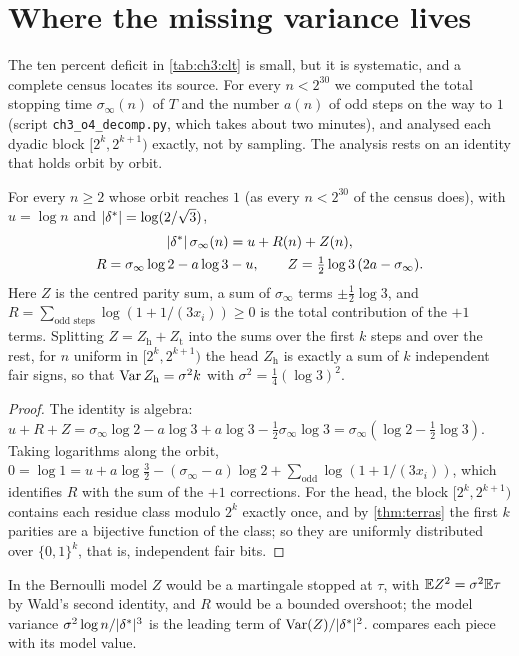 \section{Where the missing variance lives}\label{sec:ch3:missing}

The ten percent deficit in \cref{tab:ch3:clt} is small, but it is systematic,
and a complete census
locates its source. For every $n<2^{30}$ we computed the total stopping time
$\sigma_\infty(n)$ of $T$ and the number $a(n)$ of odd steps on the way to $1$ (script
\texttt{ch3\_o4\_decomp.py}, which takes about two minutes), and analysed each
dyadic block $[2^k,2^{k+1})$ exactly, not by sampling. The analysis rests on an
identity that holds orbit by orbit.

\begin{proposition}\label{prop:ch3:pathwise}
For every $n\ge2$ whose orbit reaches $1$ (as every $n<2^{30}$ of the census does), with $u=\log n$ and $|\delta^{*}|=\log(2/\sqrt3)$,
\begin{gather*}
  |\delta^{*}|\,\sigma_\infty(n)=u+R(n)+Z(n),\\
  R=\sigma_\infty\log2-a\log3-u,\qquad Z=\tfrac12\log3\,(2a-\sigma_\infty).
\end{gather*}
Here $Z$ is the centred parity sum, a sum of $\sigma_\infty$ terms $\pm\frac12\log3$, and
$R=\sum_{\text{odd steps}}\log(1+1/(3x_i))\ge0$ is the total contribution of the
$+1$ terms. Splitting $Z=Z_{\mathrm h}+Z_{\mathrm t}$ into the sums over the first
$k$ steps and over the rest, for $n$ uniform in $[2^k,2^{k+1})$ the head
$Z_{\mathrm h}$ is exactly a sum of $k$ independent fair signs, so that
$\operatorname{Var} Z_{\mathrm h}=\sigma^2k$ with $\sigma^2=\frac14(\log3)^2$.
\end{proposition}

\begin{proof}
The identity is algebra: $u+R+Z=\sigma_\infty\log2-a\log3+a\log3-\frac12\sigma_\infty\log3=
\sigma_\infty(\log2-\frac12\log3)$. Taking logarithms along the orbit,
$0=\log1=u+a\log\frac32-(\sigma_\infty-a)\log2+\sum_{\text{odd}}\log(1+1/(3x_i))$, which
identifies $R$ with the sum of the $+1$ corrections. For the head, the block
$[2^k,2^{k+1})$ contains each residue class modulo $2^k$ exactly once, and by
\cref{thm:terras} the first $k$ parities are a bijective function of the class;
so they are uniformly distributed over $\{0,1\}^k$, that is, independent fair
bits.
\end{proof}

In the Bernoulli model $Z$ would be a martingale stopped at $\tau$, with
$\mathbb{E} Z^2=\sigma^2\mathbb{E}\tau$ by Wald's second identity, and $R$ would be a bounded
overshoot; the model variance $\sigma^2\log n/|\delta^{*}|^3$ is the leading term of
$\operatorname{Var}(Z)/|\delta^{*}|^2$.  compares each piece with its model
value.

